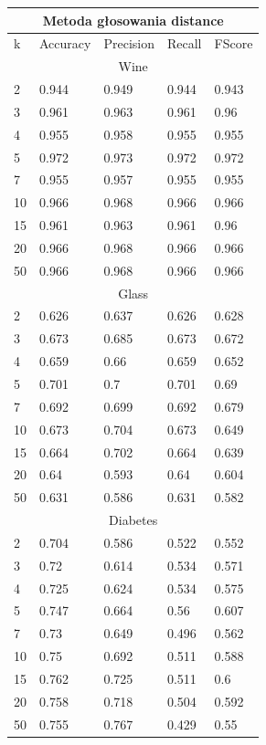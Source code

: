 \documentclass[12pt,a4paper]{article}
\begin{document}
\begin{tabular}{ |p{2.5cm}||p{2.5cm}|p{2.5cm}|p{2.5cm}|p{2.5cm}| }
\hline
\multicolumn{5}{|c|}{Metoda głosowania distance}\\
\hline
k & Accuracy & Precision & Recall & FScore \\
\hline
\multicolumn{5}{|c|}{Wine}\\
\hline
2 & 0.944 & 0.949 & 0.944 & 0.943\\
3 & 0.961 & 0.963 & 0.961 & 0.96\\
4 & 0.955 & 0.958 & 0.955 & 0.955\\
5 & 0.972 & 0.973 & 0.972 & 0.972\\
7 & 0.955 & 0.957 & 0.955 & 0.955\\
10 & 0.966 & 0.968 & 0.966 & 0.966\\
15 & 0.961 & 0.963 & 0.961 & 0.96\\
20 & 0.966 & 0.968 & 0.966 & 0.966\\
50 & 0.966 & 0.968 & 0.966 & 0.966\\
\hline
\multicolumn{5}{|c|}{Glass}\\
\hline
2 & 0.626 & 0.637 & 0.626 & 0.628\\
3 & 0.673 & 0.685 & 0.673 & 0.672\\
4 & 0.659 & 0.66 & 0.659 & 0.652\\
5 & 0.701 & 0.7 & 0.701 & 0.69\\
7 & 0.692 & 0.699 & 0.692 & 0.679\\
10 & 0.673 & 0.704 & 0.673 & 0.649\\
15 & 0.664 & 0.702 & 0.664 & 0.639\\
20 & 0.64 & 0.593 & 0.64 & 0.604\\
50 & 0.631 & 0.586 & 0.631 & 0.582\\
\hline
\multicolumn{5}{|c|}{Diabetes}\\
\hline
2 & 0.704 & 0.586 & 0.522 & 0.552\\
3 & 0.72 & 0.614 & 0.534 & 0.571\\
4 & 0.725 & 0.624 & 0.534 & 0.575\\
5 & 0.747 & 0.664 & 0.56 & 0.607\\
7 & 0.73 & 0.649 & 0.496 & 0.562\\
10 & 0.75 & 0.692 & 0.511 & 0.588\\
15 & 0.762 & 0.725 & 0.511 & 0.6\\
20 & 0.758 & 0.718 & 0.504 & 0.592\\
50 & 0.755 & 0.767 & 0.429 & 0.55\\

\end{tabular}
\end{document}
